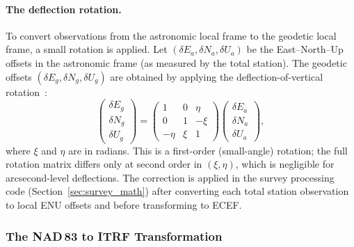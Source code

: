 \paragraph{The deflection rotation.} To convert observations from the astronomic local frame to the geodetic local frame, a small rotation is applied. Let $(\delta E_a, \delta N_a, \delta U_a)$ be the East--North--Up offsets in the astronomic frame (as measured by the total station). The geodetic offsets $(\delta E_g, \delta N_g, \delta U_g)$ are obtained by applying the deflection-of-vertical rotation~\cite{torge2012}:
\begin{equation}
\begin{pmatrix} \delta E_g \\ \delta N_g \\ \delta U_g \end{pmatrix}
=
\begin{pmatrix}
1 & 0 & \eta \\
0 & 1 & -\xi \\
-\eta & \xi & 1
\end{pmatrix}
\begin{pmatrix} \delta E_a \\ \delta N_a \\ \delta U_a \end{pmatrix},
\label{eq:deflection_rotation}
\end{equation}
where $\xi$ and $\eta$ are in radians. This is a first-order (small-angle) rotation; the full rotation matrix differs only at second order in $(\xi, \eta)$, which is negligible for arcsecond-level deflections. The correction is applied in the survey processing code (Section~\ref{sec:survey_math}) after converting each total station observation to local ENU offsets and before transforming to ECEF.

\subsubsection{The NAD\,83 to ITRF Transformation}
\label{sec:helmert}

